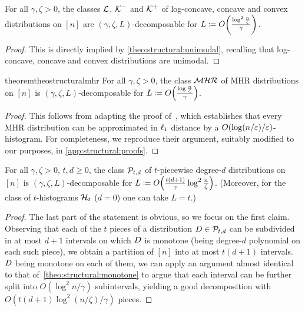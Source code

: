\begin{corollary}\label{theo:structural:logconcave}
For all $\gamma,\zeta > 0$, the classes $\classlog$, $\classcve$ and $\classcvx$ of log-concave, concave and convex distributions on $[n]$ are $(\gamma,\zeta,L)$-decomposable for $L \eqdef \bigO{\frac{\log^2 \frac{n}{\zeta}}{\gamma}}$.
\end{corollary}
\begin{proof}
This is directly implied by \cref{theo:structural:unimodal}, recalling that log-concave, concave and convex distributions are unimodal.
\end{proof}

\begin{restatable}{theorem}{theostructuralmhr}\label{theo:structural:mhr}
For all $\gamma,\zeta > 0$, the class $\classmhr$ of MHR distributions on $[n]$ is $(\gamma,\zeta,L)$-decomposable for $L \eqdef \bigO{\frac{\log \frac{n}{\zeta}}{\gamma}}$.
\end{restatable}
\begin{proof}
This follows from adapting the proof of~\cite{CDSS:13}, which establishes that every MHR distribution can be approximated in $\lp[1]$ distance by a $\bigO{\log(n/\eps)/\eps}$-histogram. For completeness, we reproduce their argument, suitably modified to our purposes, in \cref{app:structural:proofs}.
\end{proof}

\begin{theorem}\label{theo:structural:piecewise}
For all $\gamma,\zeta > 0$, $t,d\geq 0$, the class $\classpoly[t,d]$ of $t$-piecewise degree-$d$ distributions on $[n]$ is $(\gamma,\zeta,L)$-decomposable for $L \eqdef \bigO{\frac{t(d+1)}{\gamma}\log^2 \frac{n}{\zeta}}$. (Moreover, for the class of $t$-histograms $\classhist$ ($d=0$) one can take $L = t$.)
\end{theorem}
\begin{proof}
The last part of the statement is obvious, so we focus on the first claim. Observing that each of the $t$ pieces of a distribution $\D\in\classpoly[t,d]$ can be subdivided in at most $d+1$ intervals on which $\D$ is monotone (being degree-$d$ polynomial on each such piece), we obtain a partition of $[n]$ into at most $t(d+1)$ intervals. $\D$ being monotone on each of them, we can apply an argument almost identical to that of~\cref{theo:structural:monotone} to argue that each interval can be further split into $O(\log^2 n/\gamma)$ subintervals, yielding a good decomposition with $O( t(d+1)\log^2 ({n}/{\zeta})/\gamma )$ pieces.
\end{proof}



